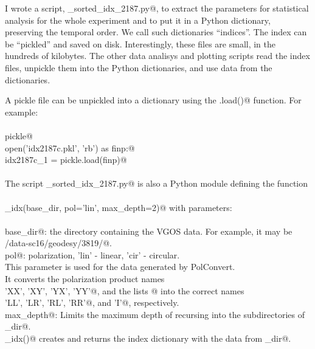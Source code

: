 \documentclass[letterpaper,twoside,12pt]{article}
\begin{document}
I wrote a script, \verb@make_sorted_idx_2187.py@, to extract the parameters for statistical analysis for the whole experiment and to put it in a Python dictionary, preserving the temporal order. We call such dictionaries ``indices''. The index can be ``pickled'' and saved on disk. Interestingly, these files are small, in the hundreds of kilobytes.  The other data analisys and plotting scripts read the index files, unpickle them into the Python dictionaries, and use data from the dictionaries.

A pickle file can be unpickled into a  dictionary using the \verb@pickle.load()@ function. For example: \\ \\
\noindent \verb@import pickle@ \\
\noindent \verb@with open('idx2187c.pkl', 'rb') as finp:@ \\
\noindent \verb@    idx2187c_1 = pickle.load(finp)@ \\ \\

\noindent The script \verb@make_sorted_idx_2187.py@ is also a Python module defining the function \\ \\
\verb@make_idx(base_dir, pol='lin', max_depth=2)@ with parameters: \\ \\
\verb@    base_dir@: the directory containing the VGOS data. For example, it may be \\
\verb@              /data-sc16/geodesy/3819/@. \\
\verb@    pol@: polarization, 'lin' - linear, 'cir' - circular. \\
    \indent \indent \indent This parameter is used for the data generated by PolConvert. \\
    \indent \indent \indent It converts the polarization product names\\
    \verb@          'XX', 'XY', 'YX', 'YY'@, and the lists \verb@['XX', 'YY']@ into the correct names \\
    \verb@          'LL', 'LR', 'RL', 'RR'@, and \verb@'I'@, respectively. \\
\verb@    max_depth@: Limits the maximum depth of recursing into the subdirectories of \verb@base_dir@. \\

\noindent \verb@make_idx()@ creates and returns the index dictionary with the data from \verb@base_dir@. \\
\end{document}
